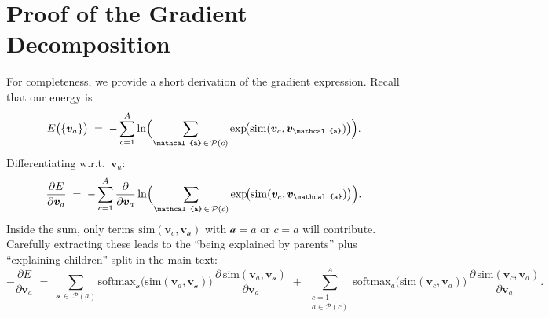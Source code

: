 \documentclass{article}
\begin{document}
\appendix
\section{Proof of the Gradient Decomposition}
\label{appendix:proof}

For completeness, we provide a short derivation of the gradient expression.  Recall that our energy is
\[
E\bigl(\{\bm{v}_a\}\bigr)
\;=\;
-\sum_{c=1}^A
\ln \Bigl(\sum_{\mathcal{a}\,\in\,\mathcal{P}(c)} 
\exp\!\bigl(\mathrm{sim}(\bm{v}_c,\bm{v}_{\mathcal{a}})\bigr)\Bigr).
\]
Differentiating w.r.t.\ \(\bm{v}_a\):
\[
\frac{\partial E}{\partial \bm{v}_a}
\;=\;
-\sum_{c=1}^A
\frac{\partial}{\partial \bm{v}_a}
\ln \Bigl(\sum_{\mathcal{a}\,\in\,\mathcal{P}(c)} 
\exp\!\bigl(\mathrm{sim}(\bm{v}_c,\bm{v}_{\mathcal{a}})\bigr)\Bigr).
\]
Inside the sum, only terms \(\mathrm{sim}(\bm{v}_c,\bm{v}_{\mathcal{a}})\) with \(\mathcal{a}=a\) or \(c=a\) will contribute.  Carefully extracting these leads to the “being explained by parents” plus “explaining children” split in the main text:
\[
-\frac{\partial E}{\partial \bm{v}_a}
\;=\;
\sum_{\mathcal{a}\,\in\,\mathcal{P}(a)}
\text{softmax}_{\mathcal{a}}
\bigl(\mathrm{sim}(\bm{v}_a,\bm{v}_{\mathcal{a}})\bigr)
\,\frac{\partial\,\mathrm{sim}(\bm{v}_a,\bm{v}_{\mathcal{a}})}{\partial \bm{v}_a}
\;+\;
\sum_{\substack{c=1\\ a\in \mathcal{P}(c)}}^A
\text{softmax}_{a}\bigl(\mathrm{sim}(\bm{v}_c,\bm{v}_a)\bigr)
\,\frac{\partial\,\mathrm{sim}(\bm{v}_c,\bm{v}_a)}{\partial \bm{v}_a}.
\]
\end{document}
